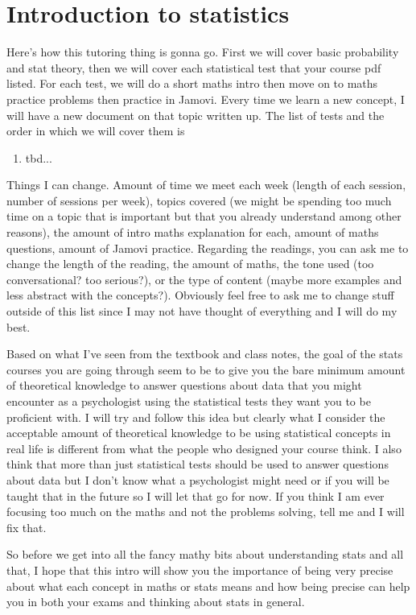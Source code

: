 \section{Introduction to statistics}

Here's how this tutoring thing is gonna go. First we will cover basic probability and stat theory, then we will cover each statistical test that your course pdf listed. For each test, we will do a short maths intro then move on to maths practice problems then practice in Jamovi. Every time we learn a new concept, I will have a new document on that topic written up. The list of tests and the order in which we will cover them is
\begin{enumerate}
    \item tbd...
\end{enumerate}
Things I can change. Amount of time we meet each week (length of each session, number of sessions per week), topics covered (we might be spending too much time on a topic that is important but that you already understand among other reasons), the amount of intro maths explanation for each, amount of maths questions, amount of Jamovi practice. Regarding the readings, you can ask me to change the length of the reading, the amount of maths, the tone used (too conversational? too serious?), or the type of content (maybe more examples and less abstract with the concepts?). Obviously feel free to ask me to change stuff outside of this list since I may not have thought of everything and I will do my best.

Based on what I've seen from the textbook and class notes, the goal of the stats courses you are going through seem to be to give you the bare minimum amount of theoretical knowledge to answer questions about data that you might encounter as a psychologist using the statistical tests they want you to be proficient with. I will try and follow this idea but clearly what I consider the acceptable amount of theoretical knowledge to be using statistical concepts in real life is different from what the people who designed your course think. I also think that more than just statistical tests should be used to answer questions about data but I don't know what a psychologist might need or if you will be taught that in the future so I will let that go for now. If you think I am ever focusing too much on the maths and not the problems solving, tell me and I will fix that.

So before we get into all the fancy mathy bits about understanding stats and all that, I hope that this intro will show you the importance of being very precise about what each concept in maths or stats means and how being precise can help you in both your exams and thinking about stats in general.

